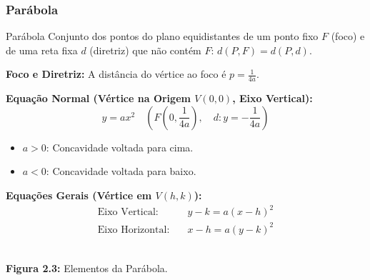 \documentclass[11pt,a4paper]{article}
\begin{document}
\subsubsection{Parábola}
\begin{minipage}{0.58\textwidth}
  \begin{definitionbox}{Parábola}
    Conjunto dos pontos do plano equidistantes de um ponto fixo $F$ (foco) e de uma reta fixa $d$ (diretriz) que não contém $F$: $d(P,F) = d(P,d)$.
    
    \textbf{Foco e Diretriz:} A distância do vértice ao foco é $p = \frac{1}{4a}$.
    
    \textbf{Equação Normal (Vértice na Origem $V(0,0)$, Eixo Vertical):}
    \begin{equation*}
      y = ax^2 \quad \left(F\left(0, \frac{1}{4a}\right), \quad d: y = -\frac{1}{4a}\right)
    \end{equation*}
    \begin{itemize}
      \item $a > 0$: Concavidade voltada para cima.
      \item $a < 0$: Concavidade voltada para baixo.
    \end{itemize}
    \textbf{Equações Gerais (Vértice em $V(h,k)$):}
    \begin{align*}
      \text{Eixo Vertical:} \quad & y - k = a(x-h)^2 \\
      \text{Eixo Horizontal:} \quad & x - h = a(y-k)^2
    \end{align*}
  \end{definitionbox}
\end{minipage}
\hfill
\begin{minipage}{0.38\textwidth}
  \centering
  \\[0.2cm]
  \small\textbf{Figura 2.3:} Elementos da Parábola.
\end{minipage}
\end{document}
